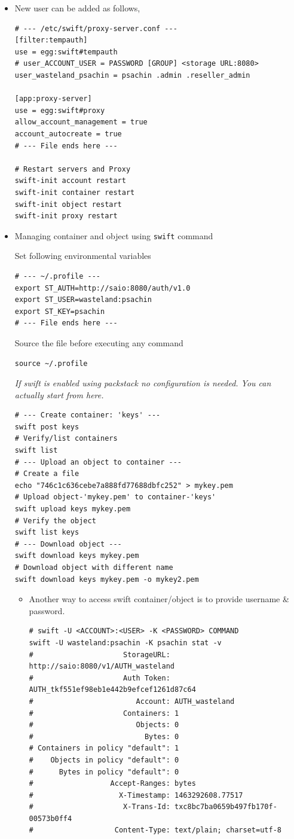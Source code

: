 \documentclass{article}
\begin{document}
\begin{itemize}
\item New user can be added as follows,
\begin{verbatim}
# --- /etc/swift/proxy-server.conf ---
[filter:tempauth]
use = egg:swift#tempauth
# user_ACCOUNT_USER = PASSWORD [GROUP] <storage URL:8080>
user_wasteland_psachin = psachin .admin .reseller_admin

[app:proxy-server]
use = egg:swift#proxy
allow_account_management = true
account_autocreate = true
# --- File ends here ---

# Restart servers and Proxy
swift-init account restart
swift-init container restart
swift-init object restart
swift-init proxy restart
\end{verbatim}
\item Managing container and object using \texttt{swift} command

Set following environmental variables
\begin{verbatim}
# --- ~/.profile ---
export ST_AUTH=http://saio:8080/auth/v1.0
export ST_USER=wasteland:psachin
export ST_KEY=psachin
# --- File ends here ---
\end{verbatim}

Source the file before executing any command
\begin{verbatim}
source ~/.profile
\end{verbatim}

\emph{If swift is enabled using packstack no configuration is needed.
You can actually start from here.}
\begin{verbatim}
# --- Create container: 'keys' ---
swift post keys
# Verify/list containers
swift list
# --- Upload an object to container ---
# Create a file
echo "746c1c636cebe7a888fd77688dbfc252" > mykey.pem
# Upload object-'mykey.pem' to container-'keys'
swift upload keys mykey.pem
# Verify the object
swift list keys
# --- Download object ---
swift download keys mykey.pem
# Download object with different name
swift download keys mykey.pem -o mykey2.pem
\end{verbatim}

\begin{itemize}
\item Another way to access swift container/object is to provide
username \& password.
\begin{verbatim}
# swift -U <ACCOUNT>:<USER> -K <PASSWORD> COMMAND
swift -U wasteland:psachin -K psachin stat -v
#                     StorageURL: http://saio:8080/v1/AUTH_wasteland
#                     Auth Token: AUTH_tkf551ef98eb1e442b9efcef1261d87c64
#                        Account: AUTH_wasteland
#                     Containers: 1
#                        Objects: 0
#                          Bytes: 0
# Containers in policy "default": 1
#    Objects in policy "default": 0
#      Bytes in policy "default": 0
#                  Accept-Ranges: bytes
#                    X-Timestamp: 1463292608.77517
#                     X-Trans-Id: txc8bc7ba0659b497fb170f-00573b0ff4
#                   Content-Type: text/plain; charset=utf-8


\end{verbatim}
\end{itemize}
\end{itemize}
\end{document}
